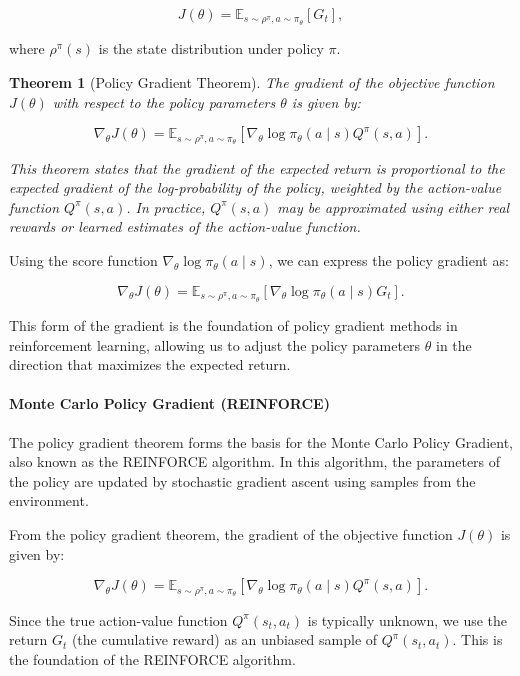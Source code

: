 \documentclass[10pt, oneside]{article}
\newtheorem{thm}{Theorem}
\theoremstyle{definition}
\begin{document}
\[
J(\theta) = \mathbb{E}_{s \sim \rho^\pi, a \sim \pi_\theta} [G_t],
\]

where \( \rho^\pi(s) \) is the state distribution under policy \( \pi \).

\begin{thm}[Policy Gradient Theorem]
The gradient of the objective function \( J(\theta) \) with respect to the policy parameters \( \theta \) is given by:

\[
\nabla_\theta J(\theta) = \mathbb{E}_{s \sim \rho^\pi, a \sim \pi_\theta} \left[ \nabla_\theta \log \pi_\theta(a \mid s) Q^\pi(s, a) \right].
\]

This theorem states that the gradient of the expected return is proportional to the expected gradient of the log-probability of the policy, weighted by the action-value function \( Q^\pi(s, a) \). In practice, \( Q^\pi(s, a) \) may be approximated using either real rewards or learned estimates of the action-value function.
\end{thm}

Using the score function \( \nabla_\theta \log \pi_\theta(a \mid s) \), we can express the policy gradient as:

\[
\nabla_\theta J(\theta) = \mathbb{E}_{s \sim \rho^\pi, a \sim \pi_\theta} \left[ \nabla_\theta \log \pi_\theta(a \mid s) G_t \right].
\]

This form of the gradient is the foundation of policy gradient methods in reinforcement learning, allowing us to adjust the policy parameters \( \theta \) in the direction that maximizes the expected return.

\paragraph{Monte Carlo Policy Gradient (REINFORCE)}

The policy gradient theorem forms the basis for the Monte Carlo Policy Gradient, also known as the REINFORCE algorithm. In this algorithm, the parameters of the policy are updated by stochastic gradient ascent using samples from the environment.

From the policy gradient theorem, the gradient of the objective function \( J(\theta) \) is given by:

\[
\nabla_\theta J(\theta) = \mathbb{E}_{s \sim \rho^\pi, a \sim \pi_\theta} \left[ \nabla_\theta \log \pi_\theta(a \mid s) Q^\pi(s, a) \right].
\]

Since the true action-value function \( Q^\pi(s_t, a_t) \) is typically unknown, we use the return \( G_t \) (the cumulative reward) as an unbiased sample of \( Q^\pi(s_t, a_t) \). This is the foundation of the REINFORCE algorithm.
\end{document}
